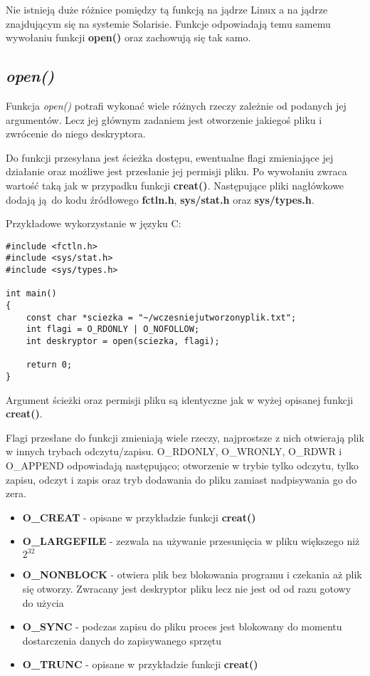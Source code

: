 \documentclass{article}
\begin{document}
Nie istnieją duże różnice pomiędzy tą funkcją na jądrze Linux a na jądrze znajdującym się na systemie Solarisie.
Funkcje odpowiadają temu samemu wywołaniu funkcji \textbf{open()} oraz zachowują się tak samo.

\subsection{\textit{open()}}
Funkcja \textit{open()} potrafi wykonać wiele różnych rzeczy zależnie od podanych jej argumentów.
Lecz jej głównym zadaniem jest otworzenie jakiegoś pliku i zwrócenie do niego deskryptora.

Do funkcji przesyłana jest ścieżka dostępu, ewentualne flagi zmieniające jej działanie oraz możliwe jest przesłanie jej permisji pliku.
Po wywołaniu zwraca wartość taką jak w przypadku funkcji \textbf{creat()}.
Następujące pliki nagłówkowe dodają ją do kodu źródłowego \textbf{fctln.h}, \textbf{sys/stat.h} oraz \textbf{sys/types.h}.

Przykładowe wykorzystanie w języku C:
\begin{verbatim}
#include <fctln.h>
#include <sys/stat.h>
#include <sys/types.h>

int main()
{
	const char *sciezka = "~/wczesniejutworzonyplik.txt";
	int flagi = O_RDONLY | O_NOFOLLOW;
	int deskryptor = open(sciezka, flagi);

	return 0;
}
\end{verbatim}

Argument ścieżki oraz permisji pliku są identyczne jak w wyżej opisanej funkcji \textbf{creat()}.

Flagi przesłane do funkcji zmieniają wiele rzeczy, najprostsze z nich otwierają plik w innych trybach odczytu/zapisu.
O\_RDONLY, O\_WRONLY, O\_RDWR i O\_APPEND odpowiadają następująco; otworzenie w trybie tylko odczytu, tylko zapisu, odczyt i zapis oraz tryb dodawania do pliku zamiast nadpisywania go do zera.

\begin{itemize}
\item \textbf{O\_CREAT} - opisane w przykładzie funkcji \textbf{creat()}
\item \textbf{O\_LARGEFILE} - zezwala na używanie przesunięcia w pliku większego niż $2^{32}$
\item \textbf{O\_NONBLOCK} - otwiera plik bez blokowania programu i czekania aż plik się otworzy. Zwracany jest deskryptor pliku lecz nie jest od od razu gotowy do użycia
\item \textbf{O\_SYNC} - podczas zapisu do pliku proces jest blokowany do momentu dostarczenia danych do zapisywanego sprzętu
\item \textbf{O\_TRUNC} - opisane w przykładzie funkcji \textbf{creat()}
\end{itemize}
\end{document}
